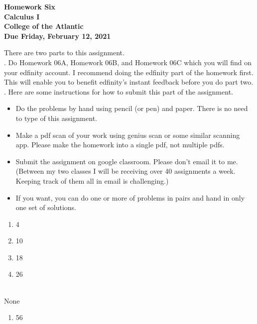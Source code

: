 \documentclass[12pt]{article}
\begin{document}
\pagestyle{empty}
 
\begin{center}
{\LARGE {\bf Homework Six}}\\
\bigskip
{\Large {\bf Calculus I}}\\
\bigskip
{\Large {\bf College of the Atlantic}}\\
\bigskip
{ {\bf Due Friday, February 12, 2021}}\\ 
\end{center}
\medskip


\noindent There are two parts to this assignment.\\

.  Do Homework 06A, Homework 06B, and
Homework 06C which you will find on your edfinity account.  I
recommend doing the edfinity part of the homework first.  This will
enable you to benefit edfinity's instant feedback before you do part
two.\\  


.  Here are some
instructions for how to submit this part of the assignment.
\begin{itemize}
\item Do the problems by hand using pencil (or pen) and paper.
  There is no need to type of this assignment.
\item Make a pdf scan of your work using genius scan or some
  similar scanning app.  Please make the homework into a single
  pdf, not multiple pdfs.
\item Submit the assignment on google classroom.  Please don't
  email it to me.  (Between my two classes I will be receiving
  over 40 assignments a week.  Keeping track of them all in email
  is challenging.)
\item If you want, you can do one or more of problems in pairs and hand 
  in only one set of solutions.\\
\end{itemize}




\begin{enumerate}
\setlength{\itemsep}{-1mm}
\item 4
\item 10
\item 18
\item 26
\end{enumerate}


\\

None\\

\begin{enumerate}
\setlength{\itemsep}{-1mm}
\item 56
\end{enumerate}
\end{document}
